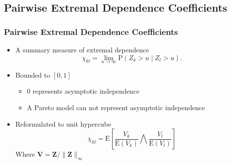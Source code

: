 \documentclass[aspectratio=169]{beamer}
\begin{document}
\subsection{Pairwise Extremal Dependence Coefficients}

\begin{frame}
  \frametitle{Pairwise Extremal Dependence Coefficients}
  {\scriptsize\citep{warner2018}}
    \begin{itemize}
      \item A summary measure of extremal dependence
      \begin{equation*}
        \chi_{kl} = \lim\limits_{u\to\infty}\text{P}\left(Z_k > u\mid Z_l > u\right).
      \end{equation*}
      \pause
      \item Bounded to $[0,1]$
        \begin{itemize}
          \item $0$ represents asymptotic independence
          \item A Pareto model can not represent asymptotic independence
        \end{itemize}
      \pause
      \item Reformulated to unit hypercube
        \begin{equation*}
          \chi_{kl} = \text{E}\left[\frac{V_k}{\text{E}(V_k)}{\bigwedge}\frac{V_l}{\text{E}(V_l)}\right]
        \end{equation*}
        Where $\bm{V} = \bm{Z} / \lVert\bm{Z}\rVert_{\infty}$
    \end{itemize}
\end{frame}
\end{document}
